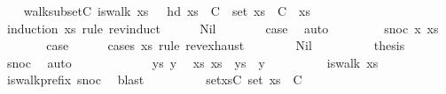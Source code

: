 \begin{isabellebody}
%
\isadelimproof
%
\endisadelimproof
%
\isatagproof
{}\isamarkupfalse%
{\isacharminus}{\kern0pt}\isanewline
\ \ \isamarkupfalse%
\ walk{\isacharunderscore}{\kern0pt}subset{\isacharunderscore}{\kern0pt}C{\isacharcolon}{\kern0pt}\ {\isachardoublequoteopen}is{\isacharunderscore}{\kern0pt}walk\ xs\ {\isasymLongrightarrow}\ \ hd\ xs\ {\isasymin}\ C\ {\isasymLongrightarrow}\ set\ xs\ {\isasymsubseteq}\ C{\isachardoublequoteclose}\ \ xs\isanewline
\ \ \isamarkupfalse%
\ {\isacharparenleft}{\kern0pt}induction\ xs\ rule{\isacharcolon}{\kern0pt}\ rev{\isacharunderscore}{\kern0pt}induct{\isacharparenright}{\kern0pt}\isanewline
\ \ \ \ \isamarkupfalse%
\ Nil\isanewline
\ \ \ \ \isamarkupfalse%
\ \isamarkupfalse%
\ {\isacharquery}{\kern0pt}case\ \isamarkupfalse%
\ auto\isanewline
\ \ \isamarkupfalse%
\isanewline
\ \ \ \ \isamarkupfalse%
\ {\isacharparenleft}{\kern0pt}snoc\ x\ xs{\isacharparenright}{\kern0pt}\isanewline
\ \ \ \ \isamarkupfalse%
\ \isamarkupfalse%
\ {\isacharquery}{\kern0pt}case\isanewline
\ \ \ \ \isamarkupfalse%
\ {\isacharparenleft}{\kern0pt}cases\ xs\ rule{\isacharcolon}{\kern0pt}\ rev{\isacharunderscore}{\kern0pt}exhaust{\isacharparenright}{\kern0pt}\isanewline
\ \ \ \ \ \ \isamarkupfalse%
\ Nil\isanewline
\ \ \ \ \ \ \isamarkupfalse%
\ \isamarkupfalse%
\ {\isacharquery}{\kern0pt}thesis\ \isamarkupfalse%
\ snoc\ \isamarkupfalse%
\ auto\isanewline
\ \ \ \ \isamarkupfalse%
\isanewline
\ \ \ \ \ \ \isamarkupfalse%
\ ys\ y\ \isamarkupfalse%
\ xs{\isacharcolon}{\kern0pt}\ {\isachardoublequoteopen}xs\ {\isacharequal}{\kern0pt}\ ys\ {\isacharat}{\kern0pt}\ {\isacharbrackleft}{\kern0pt}y{\isacharbrackright}{\kern0pt}{\isachardoublequoteclose}\isanewline
\ \ \ \ \ \ \isamarkupfalse%
\ \isamarkupfalse%
\ {\isachardoublequoteopen}is{\isacharunderscore}{\kern0pt}walk\ xs{\isachardoublequoteclose}\ \isamarkupfalse%
\ is{\isacharunderscore}{\kern0pt}walk{\isacharunderscore}{\kern0pt}prefix\ snoc{\isacharparenleft}{\kern0pt}{}{\isacharparenright}{\kern0pt}\ \isamarkupfalse%
\ blast\isanewline
\ \ \ \ \ \ \isamarkupfalse%
\ \isamarkupfalse%
\ set{\isacharunderscore}{\kern0pt}xs{\isacharunderscore}{\kern0pt}C{\isacharcolon}{\kern0pt}\ {\isachardoublequoteopen}set\ xs\ {\isasymsubseteq}\ C{\isachardoublequoteclose}\ \isamarkupfalse%

\end{isabellebody}
